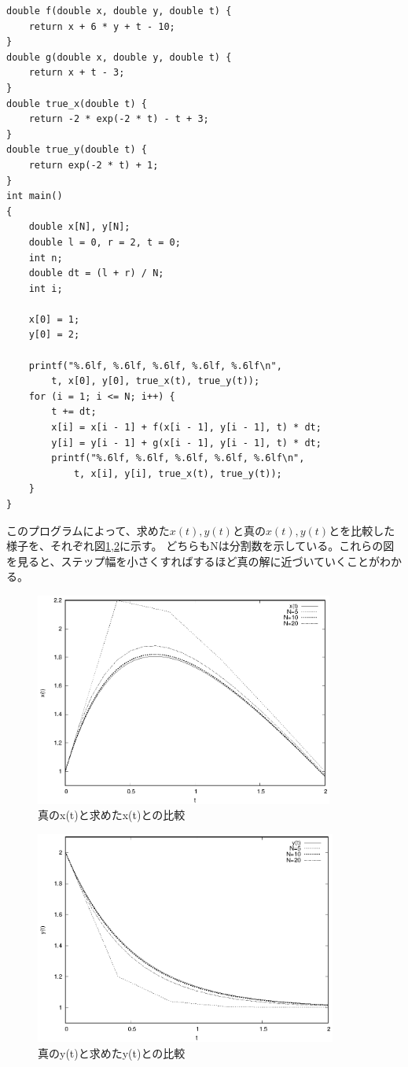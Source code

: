 \documentclass[titlepage]{jsarticle}
\begin{document}
\begin{lstlisting}[caption=作成した連立微分方程式を解くプログラム, label=src:1]
double f(double x, double y, double t) {
	return x + 6 * y + t - 10;
}
double g(double x, double y, double t) {
	return x + t - 3;
}
double true_x(double t) {
	return -2 * exp(-2 * t) - t + 3;
}
double true_y(double t) {
	return exp(-2 * t) + 1;
}
int main()
{
	double x[N], y[N];
	double l = 0, r = 2, t = 0;
	int n;
	double dt = (l + r) / N;
	int i;

	x[0] = 1;
	y[0] = 2;

	printf("%.6lf, %.6lf, %.6lf, %.6lf, %.6lf\n", 
		t, x[0], y[0], true_x(t), true_y(t));
	for (i = 1; i <= N; i++) {
		t += dt;
		x[i] = x[i - 1] + f(x[i - 1], y[i - 1], t) * dt;
		y[i] = y[i - 1] + g(x[i - 1], y[i - 1], t) * dt;
		printf("%.6lf, %.6lf, %.6lf, %.6lf, %.6lf\n", 
			t, x[i], y[i], true_x(t), true_y(t));
	}
}
\end{lstlisting}
このプログラムによって、求めた$x(t),y(t)$と真の$x(t),y(t)$とを比較した様子を、それぞれ図\ref{fig:x(t)},\ref{fig:y(t)}に示す。
どちらもNは分割数を示している。これらの図を見ると、ステップ幅を小さくすればするほど真の解に近づいていくことがわかる。
\begin{figure}[H]
	\centering
	\includegraphics[height=7cm]{1/x(t).eps}
	\caption{真のx(t)と求めたx(t)との比較}
	\label{fig:x(t)}
\end{figure}
\begin{figure}[H]
	\centering
	\includegraphics[height=7cm]{1/y(t).eps}
	\caption{真のy(t)と求めたy(t)との比較}
	\label{fig:y(t)}
\end{figure}
\end{document}
